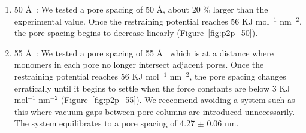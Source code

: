 \documentclass{article}
\begin{document}
\begin{enumerate}
\begin{enumerate}
		\item 50 \AA~: We tested a pore spacing of 50 \AA, about 20 \% larger than the
		experimental value. Once the restraining potential reaches 56 KJ mol$^{-1}$
		nm$^{-2}$, the pore spacing begins to decrease linearly (Figure~\ref{fig:p2p_50}).

		\item 55 \AA~: We tested a pore spacing of 55 \AA~ which is at
		a distance where monomers in each pore no longer intersect adjacent pores. Once
		the restraining potential reaches 56 KJ mol$^{-1}$ nm$^{-2}$, the pore spacing
		changes erratically until it begins to settle when the force constants are
		below 3 KJ mol$^{-1}$ nm$^{-2}$ (Figure~\ref{fig:p2p_55}). We reccomend
		avoiding a system such as this where vacuum gaps between pore columns are
		introduced unnecessarily.  The system equilibrates to a pore spacing of 4.27
		$\pm$ 0.06 nm. 

	  \end{enumerate} 


\end{enumerate}
\end{document}
